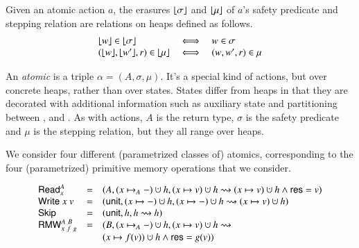 \vspace{5pt}

\begin{definition} Given an atomic action $a$,
  the erasures $\lfloor \sigma \rfloor$ and $\lfloor \mu \rfloor$ of $a$'s safety
  predicate and stepping relation are relations on heaps defined as
  follows.
%
{\small
\[
\begin{array}{lcl}
\lfloor w \rfloor \in \lfloor \sigma \rfloor & \iff & w \in \sigma\\
(\lfloor w \rfloor, \lfloor w' \rfloor, r) \in \lfloor \mu \rfloor & \iff & (w, w', r) \in \mu
\end{array}
\]}
\end{definition}

An \emph{atomic} is a triple $\alpha = (A, \sigma, \mu)$. It's a
special kind of actions, but over concrete heaps, rather than over
states. States differ from heaps in that they are decorated with
additional information such as auxiliary state and partitioning
between \self, \joint and \other.  As with actions, $A$ is the
return type, $\sigma$ is the safety predicate and $\mu$ is the
stepping relation, but they all range over heaps.

We consider four different (parametrized classes of) atomics,
corresponding to the four (parametrized) primitive memory operations
that we consider.

\vspace{5pt}

\begin{definition}
\label{def:actions}
{\small
\[
\begin{array}{lcl}
  \mathsf{Read}^A_x & = & (A, (x \hpts_A -) \hunion h, (x \hpts v) \hunion h \rightsquigarrow (x \hpts v) \hunion h \aand \result = v)\\
  \mathsf{Write}\ x\ v & = & (\mathsf{unit}, (x \hpts -) \hunion h, (x
  \hpts -) \hunion h \rightsquigarrow (x \hpts v) \hunion h)\\
  \mathsf{Skip} & = & (\mathsf{unit}, h, h \rightsquigarrow h) 
  \\
  \mathsf{RMW}^{A~B}_{x~f~g} & = & (B, (x \hpts_A -) \hunion h, (x
  \hpts v) \hunion h \rightsquigarrow \\
  && (x \hpts f(v)) \hunion h \aand \result = g(v))
\end{array}
\label{eq:actions}
\]}
  
\end{definition}

